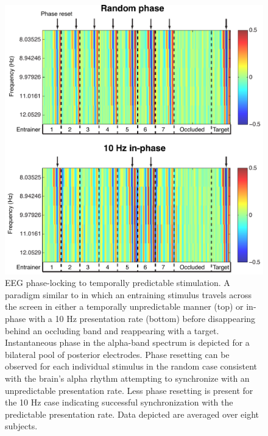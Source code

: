 \documentclass[12pt]{article}
\begin{document}
\begin{figure}[h!]
\centering
\includegraphics[width=5.5in]{phase_OBI.pdf}
\caption{\small{EEG phase-locking to temporally predictable stimulation}. A paradigm similar to \protect{} in which an entraining stimulus travels across the screen in either a temporally unpredictable manner (top) or in-phase with a 10 Hz presentation rate (bottom) before disappearing behind an occluding band and reappearing with a target. Instantaneous phase in the alpha-band spectrum is depicted for a bilateral pool of posterior electrodes. Phase resetting can be observed for each individual stimulus in the random case consistent with the brain's alpha rhythm attempting to synchronize with an unpredictable presentation rate. Less phase resetting is present for the 10 Hz case indicating successful synchronization with the predictable presentation rate. Data depicted are averaged over eight subjects.}
\label{fig:pilot_expt}
\end{figure}

%
\end{document}
